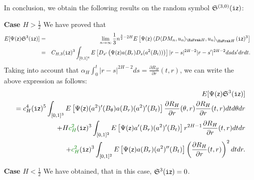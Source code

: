 \documentclass[a4paper]{article}
\newcommand{\colorg}{\color[rgb]{0,0.5,0}}
\newcommand{\colorg}{\color{black}}%
\numberwithin{equation}{section}
\def\tti{{\tt i}}
\newcommand{\sfz}{{\sf z}}
\def\HH{\EuFrak H}
\begin{document}
      
      
      \medskip
      In conclusion, we obtain the following results on the random symbol 
            ${\mathfrak S}^{(3,0)}(\tti \sfz)$:

     \medskip
     \noindent
     {\bf Case $H>\frac 12$} We have proved that
     \begin{eqnarray*}
      E [\Psi(\sfz)  \mathfrak{S}^{3} (\tti\sfz)] 
     & =& \lim_{n\rightarrow \infty} \frac 13 n^{\frac 32 -2H} E\left[ \Psi(\sfz) \left \langle D\langle DM_n, u_n \rangle_{\HH}, u_n \right\rangle_{\HH} (\tti\sfz)^3 \right] \\
     &=&   C_{H,3} (\tti\sfz)^3 \int_{[0,1]^4}   E\left[ D_{s'}  \left(  \Psi(\sfz) a(B_r) D_s (a^2(B_t)) \right) \right] |r-s|^{2H-2} |r-s'|^{2H-2}  dsds'dr  dt.
     \end{eqnarray*}
Taking into account that $\alpha_H \int_0^t  |r-s|^{2H-2} ds =\frac {\partial R_H} {\partial r}(t,r)$, we can write the above expression as follows:
          \begin{eqnarray*}
     && E [\Psi(\sfz)  \mathfrak{S}^{3} (\tti\sfz)] \\
          &&=  c_H^4 (\tti\sfz)^5 \int_{[0,1]^3}   E\left[   \Psi(\sfz) (a^2) '(B_\theta) a(B_r)  (a^2)'(B_t)   \right]    \frac {\partial R_H} {\partial r}(\theta,r)\frac {\partial R_H} {\partial r}(t,r)  dt   d\theta dr  \\
           &&\quad +   H  {\colorg c_H^2} (\tti\sfz)^3 \int_{[0,1]^2}   E\left[  \Psi(\sfz)  a'(B_r)  (a^2)'(B_t) \right]  r^{2H-1} \frac {\partial R_H} {\partial r}(t,r)  dt  dr \\
           &&\quad +     {\colorg c_H^2} (\tti\sfz)^3 \int_{[0,1]^2}   E\left[  \Psi(\sfz)  a(B_r)  (a^2)''(B_t) \right]   \left(\frac {\partial R_H} {\partial r}(t,r) \right )^2dt  dr. \\
     \end{eqnarray*}
     
      
         \medskip
     \noindent
     {\bf Case $H<\frac 12$}  We have obtained, that in this case, $\mathfrak{S}^{3} (\tti\sfz)=0$.
     
  
 
\end{document}
